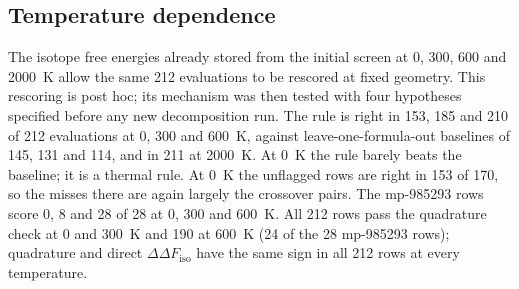 \documentclass[aps,prmaterials,reprint,superscriptaddress,nofootinbib]{revtex4-2}
\newcommand{\ddF}{\Delta\Delta F_{\mathrm{iso}}}
\begin{document}
\subsection{Temperature dependence}
\label{sec:temperature}

The isotope free energies already stored from the initial screen at 0, 300, 600 and 2000~K allow the same 212 evaluations to be rescored at fixed geometry. This rescoring is post hoc; its mechanism was then tested with four hypotheses specified before any new decomposition run. The rule is right in 153, 185 and 210 of 212 evaluations at 0, 300 and 600~K, against leave-one-formula-out baselines of 145, 131 and 114, and in 211 at 2000~K. At 0~K the rule barely beats the baseline; it is a thermal rule. At 0~K the unflagged rows are right in 153 of 170, so the misses there are again largely the crossover pairs. The mp-985293 rows score 0, 8 and 28 of 28 at 0, 300 and 600~K. All 212 rows pass the quadrature check at 0 and 300~K and 190 at 600~K (24 of the 28 mp-985293 rows); quadrature and direct $\ddF$ have the same sign in all 212 rows at every temperature.
\end{document}
